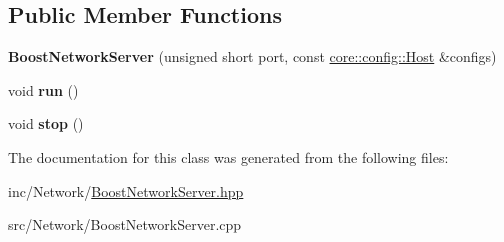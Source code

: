 \subsection*{Public Member Functions}
\begin{DoxyCompactItemize}
\item 
\mbox{\label{classnet_1_1BoostNetworkServer_a0ab652342b8000e5192c67ab595fdc0b}} 
{\bfseries Boost\+Network\+Server} (unsigned short port, const \hyperlink{classcore_1_1config_1_1Host}{core\+::config\+::\+Host} \&configs)
\item 
\mbox{\label{classnet_1_1BoostNetworkServer_ad3ff8de9d2acf73bfbc264885bb1560d}} 
void {\bfseries run} ()
\item 
\mbox{\label{classnet_1_1BoostNetworkServer_a867c0aaca77e90d05ea7ba3136b4a7e3}} 
void {\bfseries stop} ()
\end{DoxyCompactItemize}


The documentation for this class was generated from the following files\+:\begin{DoxyCompactItemize}
\item 
inc/\+Network/\hyperlink{BoostNetworkServer_8hpp}{Boost\+Network\+Server.\+hpp}\item 
src/\+Network/Boost\+Network\+Server.\+cpp\end{DoxyCompactItemize}
